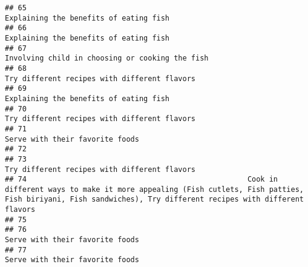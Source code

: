 \documentclass[
]{article}
\begin{document}
\begin{verbatim}
## 65                                                                                                                                                                        Explaining the benefits of eating fish
## 66                                                                                                                                                                        Explaining the benefits of eating fish
## 67                                                                                                                                                               Involving child in choosing or cooking the fish
## 68                                                                                                                                                                  Try different recipes with different flavors
## 69                                                                                                                                                                        Explaining the benefits of eating fish
## 70                                                                                                                                                                  Try different recipes with different flavors
## 71                                                                                                                                                                               Serve with their favorite foods
## 72                                                                                                                                                                                                              
## 73                                                                                                                                                                  Try different recipes with different flavors
## 74                                                   Cook in different ways to make it more appealing (Fish cutlets, Fish patties, Fish biriyani, Fish sandwiches), Try different recipes with different flavors
## 75                                                                                                                                                                                                              
## 76                                                                                                                                                                               Serve with their favorite foods
## 77                                                                                                                                                                               Serve with their favorite foods

\end{verbatim}
\end{document}

